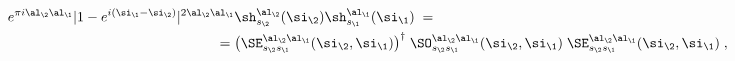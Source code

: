 \begin{equation}\begin{aligned}
e^{\pi i \al_\2\al_\1}
|1-e^{i(\si_\1-\si_\2)}|^{2\al_\2\al_\1} & 
\sh_{s_\2}^{\al_\2}(\si_\2)\sh_{s_\1}^{\al_\1}(\si_\1)
\;=\;\\
=\;& \big(\SE^{\al_\2\al_\1}_{s_\2s_\1}(\si_\2,\si_\1)\big)^{\dagger}\;
\SO^{\al_\2\al_\1}_{s_\2s_\1}(\si_\2,\si_\1)\;
\SE^{\al_\2\al_\1}_{s_\2s_\1}(\si_\2,\si_\1)\;, 
\end{aligned}\label{cb_ordered}
\end{equation} 
